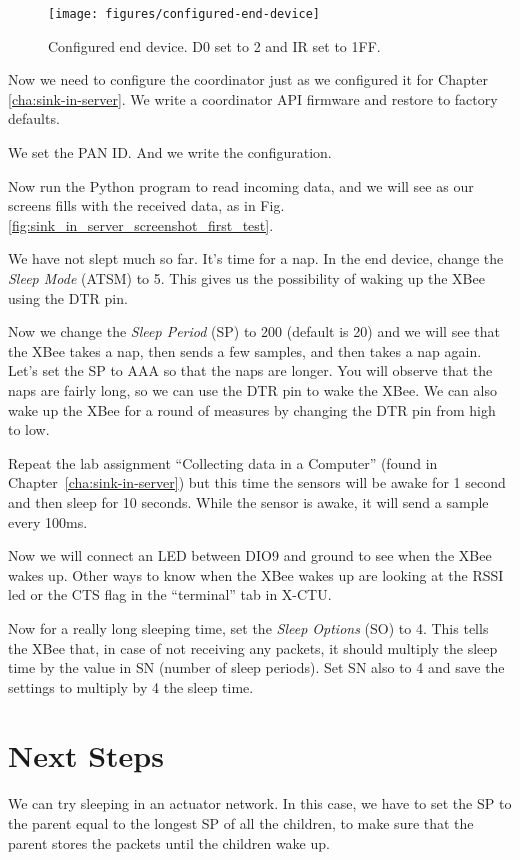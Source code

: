 \begin{figure}[htbp]
  \centering
  \texttt{[image: figures/configured-end-device]}
  \caption{Configured end device. D0 set to 2 and IR set to 1FF.}
  \label{fig:configured-end-device}
\end{figure}

Now we need to configure the coordinator just as we configured it for 
Chapter \ref{cha:sink-in-server}.
We write a coordinator API firmware and restore to factory defaults.

We set the PAN ID.
And we write the configuration.

Now run the Python program to read incoming data, and we will see as our screens fills with the received data, as in Fig. \ref{fig:sink_in_server_screenshot_first_test}.


We have not slept much so far.
It's time for a nap.
In the end device, change the \emph{Sleep Mode} (ATSM) to 5.
This gives us the possibility of waking up the XBee using the DTR pin.

Now we change the \emph{Sleep Period} (SP) to 200 (default is 20) and we will see that the XBee takes a nap, then sends a few samples, and then takes a nap again.
Let's set the SP to AAA so that the naps are longer.
You will observe that the naps are fairly long, so we can use the DTR pin to wake the XBee.
We can also wake up the XBee for a round of measures by changing the DTR pin from high to low.

Repeat the lab assignment ``Collecting data in a Computer'' (found in Chapter~\ref{cha:sink-in-server}) but this time the sensors will be awake for 1 second and then sleep for 10 seconds.
While the sensor is awake, it will send a sample every 100ms.

Now we will connect an LED between DIO9 and ground to see when the XBee wakes up.
Other ways to know when the XBee wakes up are looking at the RSSI led or the CTS flag in the ``terminal'' tab in X-CTU.

Now for a really long sleeping time, set the \emph{Sleep Options} (SO) to 4.
This tells the XBee that, in case of not receiving any packets, it should multiply the sleep time by the value in SN (number of sleep periods).
Set SN also to 4 and save the settings to multiply by 4 the sleep time.

\section{Next Steps}
We can try sleeping in an actuator network.
In this case, we have to set the SP to the parent equal to the longest SP of all the children, to make sure that the parent stores the packets until the children wake up.
